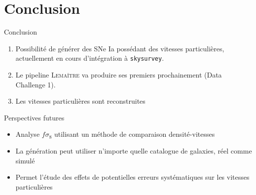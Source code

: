 \documentclass{beamer}
\newcommand{\lemaitre}{\textsc{Lemaître}\xspace}
\begin{document}

\section{Conclusion}

\begin{frame}{Conclusion}
\begin{enumerate}
\item Possibilité de générer des SNe Ia possédant des vitesses particulières, actuellement en cours d'intégration à \texttt{skysurvey}.
\item Le pipeline \lemaitre va produire ses premiers prochainement (Data Challenge 1).
\item Les vitesses particulières sont reconstruites
\end{enumerate}
\end{frame}

\begin{frame}{Perspectives futures}
\begin{itemize}
\item Analyse $f\sigma_8$ utilisant un méthode de comparaison densité-vitesses
\item La génération peut utiliser n'importe quelle catalogue de galaxies, réel comme simulé
\item Permet l'étude des effets de potentielles erreurs systématiques sur les vitesses particulières
\end{itemize}
\end{frame}
\end{document}
